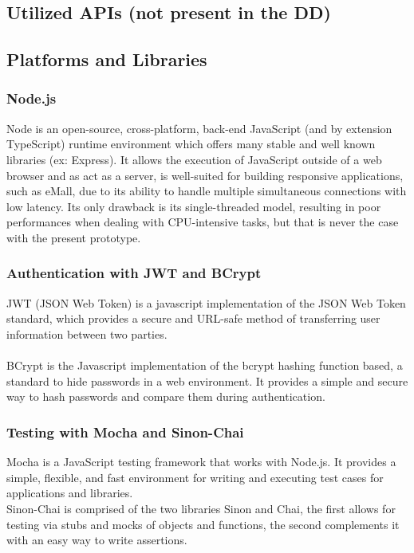\documentclass[11pt]{article}
\begin{document}
\subsection{Utilized APIs (not present in the DD)}


\subsection{Platforms and Libraries}

\subsubsection{Node.js}

Node is an open-source, cross-platform, back-end JavaScript (and by extension TypeScript) runtime environment which offers many stable and well known libraries (ex: Express). It allows the execution of JavaScript outside of a web browser and as act as a server, is well-suited for building responsive applications, such as eMall, due to its ability to handle multiple simultaneous connections with low latency. Its only drawback is its single-threaded model, resulting in poor performances when dealing with CPU-intensive tasks, but that is never the case with the present prototype.

\subsubsection{Authentication with JWT and BCrypt}

JWT (JSON Web Token) is a javascript implementation of the JSON Web Token standard, which provides a secure and URL-safe method of transferring user information between two parties. \\
\\
BCrypt is the Javascript implementation of the bcrypt hashing function based, a standard to hide passwords in a web environment. It provides a simple and secure way to hash passwords and compare them during authentication.

\subsubsection{Testing with Mocha and Sinon-Chai}

Mocha is a JavaScript testing framework that works with Node.js. It provides a simple, flexible, and fast environment for writing and executing test cases for applications and libraries. \\
Sinon-Chai is comprised of the two libraries Sinon and Chai, the first allows for testing via stubs and mocks of objects and functions, the second complements it with an easy way to write assertions.
\end{document}
